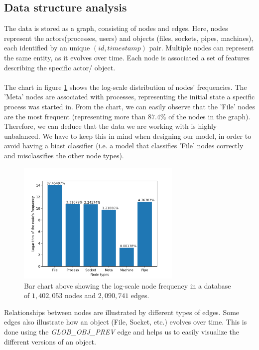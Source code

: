 	\subsection{Data structure analysis} \label{Section: prep/datastructure}
	The data is stored as a graph, consisting of nodes and edges. Here, nodes represent the actors(processes, users) and objects (files, sockets, pipes, machines), each identified by an unique $(id, timestamp)$ pair. Multiple nodes can represent the same entity, as it evolves over time. Each node is associated a set of features describing the specific actor/ object. 
	\\ \\
	The chart in figure \ref{Figure 2.1.1} shows the log-scale distribution of nodes' frequencies. The 'Meta' nodes are associated with processes, representing the initial state a specific process was started in. From the chart, we can easily observe that the 'File' nodes are the most frequent (representing more than $87.4\%$ of the nodes in the graph). Therefore, we can deduce that the data we are working with is highly unbalanced. We have to keep this in mind when designing our model, in order to avoid having a biast classifier (i.e. a model that classifies 'File' nodes correctly and misclassifies the other node types). 
	\begin{figure}[H]
		\centering
		\label{Figure 2.1.1}
		\includegraphics[width=0.7\textwidth]{graphics/node-freq-graph}
		\caption[\textbf{Log-scale node frequency}]{
			Bar chart above showing the log-scale node frequency in a database of $1,402,053$ nodes and $2,090,741$ edges. 
		}
	\end{figure}
	Relationships between nodes are illustrated by different types of edges. Some edges also illustrate how an object (File, Socket, etc.) evolves over time. This is done using the \textit{GLOB\_OBJ\_PREV} edge and helps us to easily visualize the different versions of an object.
